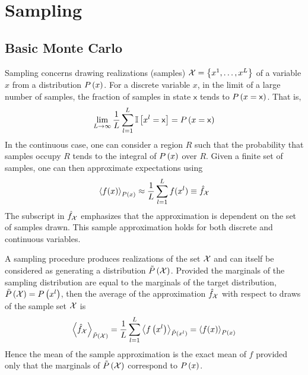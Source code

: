 \section{Sampling}
\label{section12.6}

\subsection{Basic Monte Carlo}

Sampling concerns drawing realizations (samples) $\cX=\left\{x^1,\dotsc,x^L\right\}$ of a variable $x$ from a distribution $\P{x}$. For a discrete variable $x$, in the limit of a large number of samples, the fraction of samples in state $\mathsf{x}$ tends to $\P{x=\mathsf{x}}$. That is,
\begin{align*}
	\lim_{L\to\infty}\frac{1}{L}\sum_{l=1}^L\bI\left[x^l=\mathsf{x}\right]=\P{x=\mathsf{x}}
\end{align*}
In the continuous case, one can consider a region $R$ such that the probability that samples occupy $R$ tends to the integral of $\P{x}$ over $R$. Given a finite set of samples, one can then approximate expectations using
\begin{align*}
	\vecx{f(x)}_{\P{x}}\approx\frac{1}{L}\sum_{l=1}^Lf(x^l)\equiv\hat{f}_\cX
\end{align*}
The subscript in $\hat{f}_\cX$ emphasizes that the approximation is dependent on the set of samples drawn. This sample approximation holds for both discrete and continuous variables.

A sampling procedure produces realizations of the set $\cX$ and can itself be considered as generating a distribution $\ti{P}\left(\cX\right)$. Provided the marginals of the sampling distribution are equal to the marginals of the target distribution, $\ti{P}\left(\cX\right)=\P{x^l}$, then the average of the approximation $\hat{f}_\cX$ with respect to draws of the sample set $\cX$ is
\begin{align*}
	\vecx{\hat{f}_\cX}_{\ti{P}\left(\cX\right)}=\frac{1}{L}\sum_{l=1}^L\vecx{f\left(x^l\right)}_{\ti{P}\left(x^l\right)}=\vecx{f(x)}_{\P{x}}
\end{align*}
Hence the mean of the sample approximation is the exact mean of $f$ provided only that the marginals of $\ti{P}\left(\cX\right)$ correspond to $\P{x}$.

